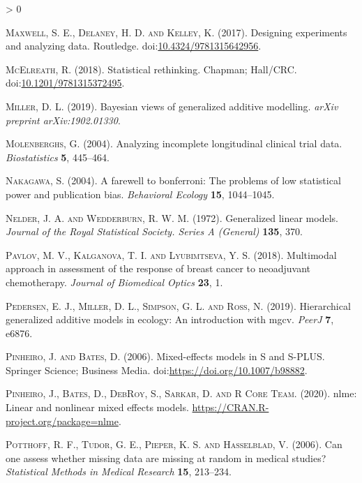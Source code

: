 \documentclass[
]{article}
\newlength{\cslhangindent}
\newenvironment{CSLReferences}[2] %
 {%
  \setlength{\parindent}{0pt}
  \ifodd #1 \everypar{\setlength{\hangindent}{\cslhangindent}}\ignorespaces\fi
  \ifnum #2 > 0
  \setlength{\parskip}{#2\baselineskip}
  \fi
 }%
 {}
\begin{document}
\begin{CSLReferences}{1}{0}
\leavevmode\hypertarget{ref-maxwell2017}{}%
\textsc{Maxwell, S. E., Delaney, H. D. and Kelley, K.} (2017). Designing experiments and analyzing data. Routledge. doi:\href{https://doi.org/10.4324/9781315642956}{10.4324/9781315642956}.

\leavevmode\hypertarget{ref-mcelreath2018}{}%
\textsc{McElreath, R.} (2018). Statistical rethinking. Chapman; Hall/{CRC}. doi:\href{https://doi.org/10.1201/9781315372495}{10.1201/9781315372495}.

\leavevmode\hypertarget{ref-miller2019}{}%
\textsc{Miller, D. L.} (2019). Bayesian views of generalized additive modelling. \emph{arXiv preprint arXiv:1902.01330}.

\leavevmode\hypertarget{ref-molenberghs2004}{}%
\textsc{Molenberghs, G.} (2004). Analyzing incomplete longitudinal clinical trial data. \emph{Biostatistics} \textbf{5}, 445--464.

\leavevmode\hypertarget{ref-nakagawa2004}{}%
\textsc{Nakagawa, S.} (2004). A farewell to bonferroni: The problems of low statistical power and publication bias. \emph{Behavioral Ecology} \textbf{15}, 1044--1045.

\leavevmode\hypertarget{ref-nelder1972}{}%
\textsc{Nelder, J. A. and Wedderburn, R. W. M.} (1972). Generalized linear models. \emph{Journal of the Royal Statistical Society. Series A (General)} \textbf{135}, 370.

\leavevmode\hypertarget{ref-pavlov2018}{}%
\textsc{Pavlov, M. V., Kalganova, T. I. and Lyubimtseva, Y. S.} (2018). Multimodal approach in assessment of the response of breast cancer to neoadjuvant chemotherapy. \emph{Journal of Biomedical Optics} \textbf{23}, 1.

\leavevmode\hypertarget{ref-pedersen2019}{}%
\textsc{Pedersen, E. J., Miller, D. L., Simpson, G. L. and Ross, N.} (2019). Hierarchical generalized additive models in ecology: An introduction with mgcv. \emph{{PeerJ}} \textbf{7}, e6876.

\leavevmode\hypertarget{ref-pinheiro2006}{}%
\textsc{Pinheiro, J. and Bates, D.} (2006). {Mixed-effects models in S and S-PLUS}. Springer Science; Business Media. doi:\url{https://doi.org/10.1007/b98882}.

\leavevmode\hypertarget{ref-nlme}{}%
\textsc{Pinheiro, J., Bates, D., DebRoy, S., Sarkar, D. and R Core Team}. (2020). {nlme}: Linear and nonlinear mixed effects models. \url{https://CRAN.R-project.org/package=nlme}.

\leavevmode\hypertarget{ref-potthoff2006}{}%
\textsc{Potthoff, R. F., Tudor, G. E., Pieper, K. S. and Hasselblad, V.} (2006). Can one assess whether missing data are missing at random in medical studies? \emph{Statistical Methods in Medical Research} \textbf{15}, 213--234.


\end{CSLReferences}
\end{document}
